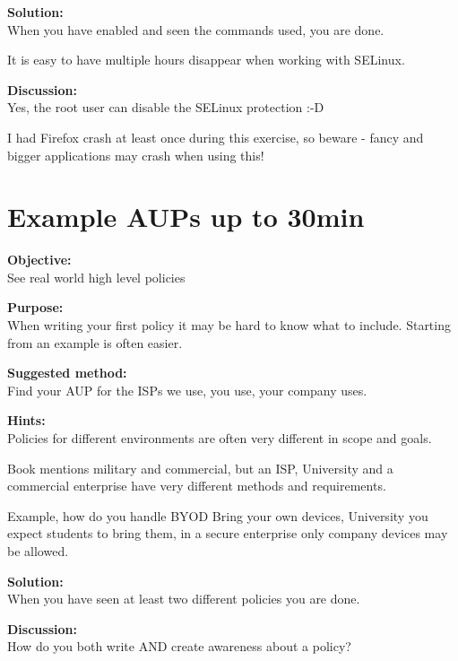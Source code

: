 \documentclass[a4paper,11pt,notitlepage]{report}
\begin{document}
{\bf Solution:}\\
When you have enabled and seen the commands used, you are done.

It is easy to have multiple hours disappear when working with SELinux.

{\bf Discussion:}\\
Yes, the root user can disable the SELinux protection :-D

I had Firefox crash at least once during this exercise, so beware - fancy and bigger applications may crash when using this!

\chapter{Example AUPs up to 30min}
\label{ex:example-AUP}

{\bf Objective:}\\
See real world high level policies

{\bf Purpose:}\\
When writing your first policy it may be hard to know what to include. Starting from an example is often easier.

{\bf Suggested method:}\\
Find your AUP for the ISPs we use, you use, your company uses.

{\bf Hints:}\\
Policies for different environments are often very different in scope and goals.

Book mentions military and commercial, but an ISP, University and a commercial enterprise have very different methods and requirements.

Example, how do you handle BYOD Bring your own devices, University you expect students to bring them, in a secure enterprise only company devices may be allowed.

{\bf Solution:}\\
When you have seen at least two different policies you are done.

{\bf Discussion:}\\
How do you both write AND create awareness about a policy?
\end{document}
